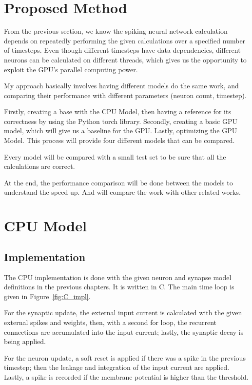 \documentclass[conference]{IEEEtran}
\begin{document}
\section{Proposed Method}
From the previous section, we know the spiking neural network calculation depends on repeatedly performing the given calculations over a specified number of timesteps. 
Even though different timesteps have data dependencies, different neurons can be calculated on different threads, which gives us the opportunity to exploit the GPU's parallel computing power.

My approach basically involves having different models do the same work, and comparing their performance with different parameters (neuron count, timestep).

Firstly, creating a base with the CPU Model, then having a reference for its correctness by using the Python torch library.
Secondly, creating a basic GPU model, which will give us a baseline for the GPU. 
Lastly, optimizing the GPU Model. This process will provide four different models that can be compared. 

Every model will be compared with a small test set to be sure that all the calculations are correct.

At the end, the performance comparison will be done between the models to understand the speed-up. And will compare the work with other related works.


\section{CPU Model}

\subsection{Implementation}

The CPU implementation is done with the given neuron and synapse model definitions
in the previous chapters. It is written in C. The main time loop is given in Figure~\ref{fig:C_impl}. 
  
  For the synaptic update, the external input current is calculated with the given external spikes and weights, then, with a second for loop, 
  the recurrent connections are accumulated into the input current; lastly, the synaptic decay is being applied.
  
  For the neuron update, a soft reset is applied if there was a spike in the previous timestep;
  then the leakage and integration of the input current are applied. Lastly, a spike 
  is recorded if the membrane potential is higher than the threshold. \\
\end{document}
